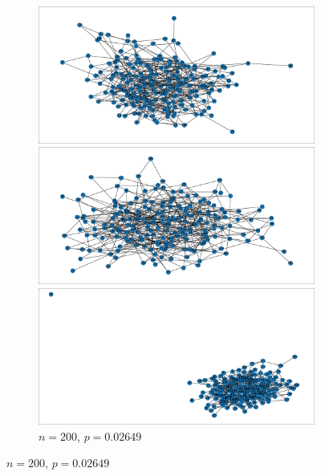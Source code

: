 \documentclass{article}
\begin{document}
\begin{figure}[htb]
    \par\bigskip

    \begin{subfigure}{\textwidth}
        \centering
        \begin{minipage}{0.32\textwidth}
            \centering
            \includegraphics[width=\linewidth]{images/erdos_renyi/n200_p0.02649158683274018_0.pdf}
        \end{minipage}\hfill
        \begin{minipage}{0.32\textwidth}
            \centering
            \includegraphics[width=\linewidth]{images/erdos_renyi/n200_p0.02649158683274018_1.pdf}
        \end{minipage}\hfill
        \begin{minipage}{0.32\textwidth}
            \centering
            \includegraphics[width=\linewidth]{images/erdos_renyi/n200_p0.02649158683274018_2.pdf}
        \end{minipage}
        \caption{$n=200$, $p=0.02649$}
    \end{subfigure}


\end{figure}
\end{document}
